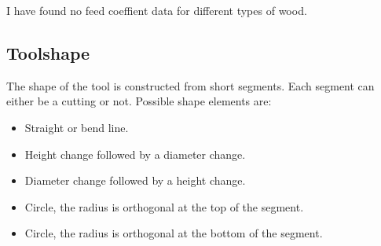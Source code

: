 I have found no feed coeffient data for different types of wood.

\subsection{Toolshape}

The shape of the tool is constructed from short segments.
Each segment can either be a cutting or not.
Possible shape elements are:

\begin{itemize}
\item Straight or bend line.
\item Height change followed by a diameter change.
\item Diameter change followed by a height change.
\item Circle, the radius is orthogonal at the top of the segment.
\item Circle, the radius is orthogonal at the bottom of the segment.
\end{itemize}

